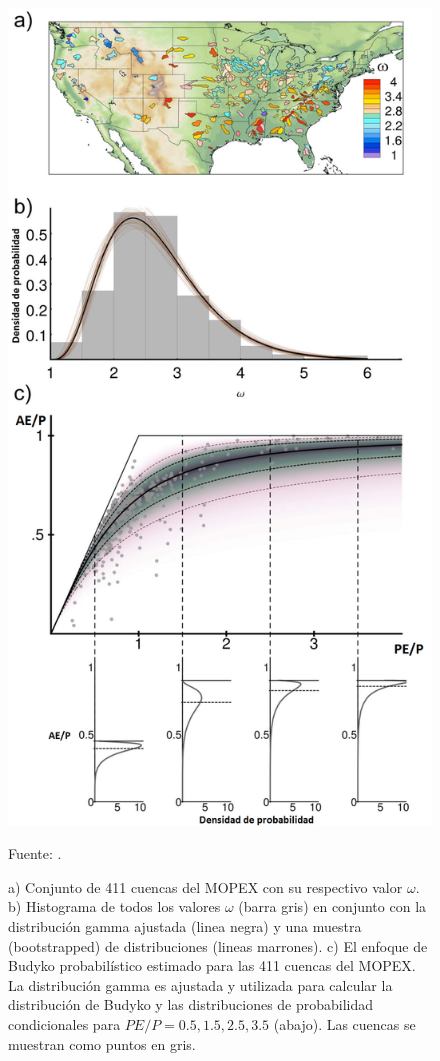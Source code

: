 \begin{figure}[ht!]
\centering
	\includegraphics[scale=0.33]{Images/Greve03.png}
	\caption{a) Conjunto de 411 cuencas del MOPEX con su respectivo valor $\omega$. b) Histograma de todos los valores $\omega$ (barra gris) en conjunto con la distribución gamma ajustada (linea negra) y una muestra (bootstrapped) de distribuciones (lineas marrones). c) El enfoque de Budyko probabilístico estimado para las 411 cuencas del MOPEX. La distribución gamma es ajustada y utilizada para calcular la distribución de Budyko y las distribuciones de probabilidad condicionales para $PE/P = 0.5, 1.5, 2.5, 3.5$ (abajo). Las cuencas se muestran como puntos en gris.}
	Fuente: \citet{Greve2015}.
	\label{fig:Greve03}
\end{figure}